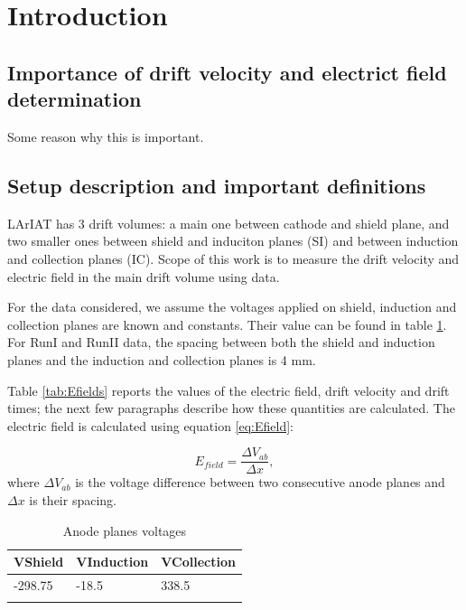 \section{Introduction}\label{sec:Introduction}

\subsection{Importance of drift velocity and electrict field determination}\label{sec:Intro}
Some reason why this is important.


\subsection{Setup description and important definitions }\label{sec:Def}
LArIAT has 3 drift volumes: a main one between cathode and shield plane, and two smaller ones between shield and induciton planes (SI) and between induction and collection planes (IC). Scope of this work is to measure the drift velocity and electric field in the main drift volume using data.

For the data considered, we assume the voltages applied on shield, induction and collection planes are known and constants. Their value can be found in table \ref{tab:voltages}.
For RunI and RunII data, the spacing between both the shield and induction planes and the induction and collection planes is 4 mm. 

Table \ref{tab:Efields} reports the values of the electric field, drift velocity and drift times; the next few paragraphs describe how these quantities are calculated.  The electric field is calculated using equation \ref{eq:Efield}:

\begin{equation} E_{field}=\frac{\Delta V_{ab}}{\Delta x}, \label{eq:Efield}
\end{equation}
where $\Delta V_{ab}$ is the voltage difference between two consecutive anode planes and $\Delta x$ is their spacing.

\begin{table}[]
\centering
\caption{Anode planes voltages}
\label{tab:voltages}
\begin{tabular}{lll}
\hline
\multicolumn{1}{|l|}{VShield} & \multicolumn{1}{l|}{VInduction} & \multicolumn{1}{l|}{VCollection} \\ \hline
\multicolumn{1}{|l|}{-298.75} & \multicolumn{1}{l|}{-18.5}      & \multicolumn{1}{l|}{338.5}       \\ \hline
                              &                                 &                                 
\end{tabular}
\end{table}



